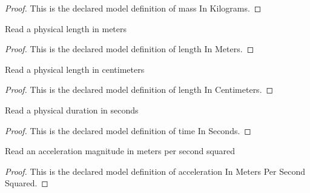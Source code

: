 \begin{proof}
  This is the declared model definition of mass In Kilograms.
\end{proof}
\begin{definition}
  \label{def:physics:phyx-mini-0264:phyxminiproblems-problemphyxmini0264-lengthinmeters}
  Read a physical length in meters
\end{definition}
\begin{proof}
  This is the declared model definition of length In Meters.
\end{proof}
\begin{definition}
  \label{def:physics:phyx-mini-0264:phyxminiproblems-problemphyxmini0264-lengthincentimeters}
  Read a physical length in centimeters
\end{definition}
\begin{proof}
  This is the declared model definition of length In Centimeters.
\end{proof}
\begin{definition}
  \label{def:physics:phyx-mini-0264:phyxminiproblems-problemphyxmini0264-timeinseconds}
  Read a physical duration in seconds
\end{definition}
\begin{proof}
  This is the declared model definition of time In Seconds.
\end{proof}
\begin{definition}
  \label{def:physics:phyx-mini-0264:phyxminiproblems-problemphyxmini0264-accelerationinmeterspersecondsquared}
  Read an acceleration magnitude in meters per second squared
\end{definition}
\begin{proof}
  This is the declared model definition of acceleration In Meters Per Second Squared.
\end{proof}
